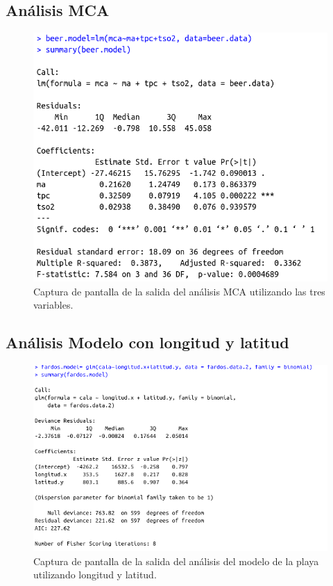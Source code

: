 \documentclass{article}
\begin{document}
\newpage
\subsection{Análisis MCA}
\begin{figure}[htbp]
    \centering
    \includegraphics[scale=0.4]{images/mca_3_variables.png}
    \caption{Captura de pantalla de la salida del análisis MCA  utilizando las tres variables.}
    \label{fig:mca_3_variables}
\end{figure}


\newpage
\subsection{Análisis Modelo con longitud y latitud}
\begin{figure}[htbp]
    \centering
    \includegraphics[scale=0.6]{images/modelo_2_param.png}
    \caption{Captura de pantalla de la salida del análisis del modelo de la playa utilizando longitud y latitud.}
    \label{fig:modelo_2_param}
\end{figure}
\end{document}
